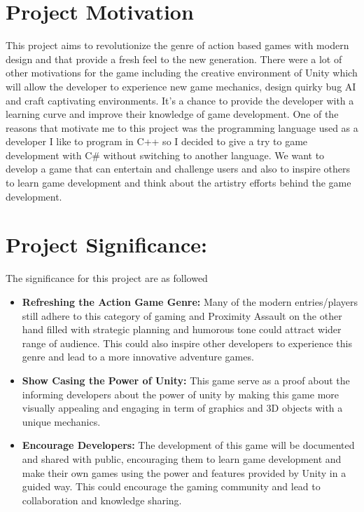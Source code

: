 \section{Project Motivation}
This project aims to revolutionize the genre of action based games with modern design and that provide a fresh feel to the new generation. There were a lot of other motivations for the game including the creative environment of Unity which will allow the developer to experience new game mechanics, design quirky bug AI and craft captivating environments. It’s a chance to provide the developer with a learning curve and improve their knowledge of game development. One of the reasons that motivate me to this project was the programming language used as a developer I like to program in C++ so I decided to give a try to game development with C\# without switching to another language.
We want to develop a game that can entertain and challenge users and also to inspire others to learn game development and think about the artistry efforts behind the game development.

\section{Project Significance:}
The significance for this project are as followed
\begin{itemize}
	\item \textbf{Refreshing the Action Game Genre:}
	Many of the modern entries/players still adhere to this category of gaming and Proximity Assault on the other hand filled with strategic planning and humorous tone could attract wider range of audience. This could also inspire other developers to experience this genre and lead to a more innovative adventure games.
	\item \textbf{Show Casing the Power of Unity:}
	This game serve as a proof about the informing developers about the power of unity by making this game more visually appealing and engaging in term of graphics and 3D objects with a unique mechanics.
	\item \textbf{Encourage Developers:}
	The development of this game will be documented and shared with public, encouraging them to learn game development and make their own games using the power and features provided by Unity in a guided way. This could encourage the gaming community and lead to collaboration and knowledge sharing.
\end{itemize}

